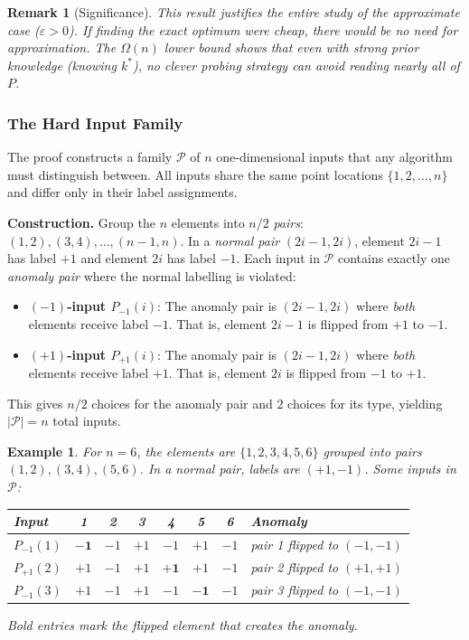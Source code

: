 \documentclass[11pt, a4paper]{article}
\theoremstyle{boxed}
\newtheorem{innerexample}{Example}[section]
\newtheorem{innerremark}{Remark}[section]
\newenvironment{example}
  {\begin{mdframed}[style=thmstyle]\begin{innerexample}}
  {\end{innerexample}\end{mdframed}}
\newenvironment{remark}
  {\begin{mdframed}[style=notestyle]\begin{innerremark}}
  {\end{innerremark}\end{mdframed}}
\newcommand{\kstar}{k^{*}}
\begin{document}
\begin{remark}[Significance]
This result justifies the entire study of the approximate case ($\varepsilon > 0$). If finding the exact optimum were cheap, there would be no need for approximation. The $\Omega(n)$ lower bound shows that \emph{even with strong prior knowledge} (knowing $\kstar$), no clever probing strategy can avoid reading nearly all of $P$.
\end{remark}

\subsubsection{The Hard Input Family}

The proof constructs a family $\mathcal{P}$ of $n$ one-dimensional inputs that any algorithm must distinguish between. All inputs share the same point locations $\{1, 2, \ldots, n\}$ and differ only in their label assignments.

\medskip
\noindent\textbf{Construction.} Group the $n$ elements into $n/2$ \emph{pairs}: $(1,2), (3,4), \ldots, (n-1, n)$. In a \emph{normal pair} $(2i-1, 2i)$, element $2i-1$ has label $+1$ and element $2i$ has label $-1$. Each input in $\mathcal{P}$ contains exactly one \emph{anomaly pair} where the normal labelling is violated:

\begin{itemize}
  \item \textbf{$(-1)$-input $P_{-1}(i)$}: The anomaly pair is $(2i-1, 2i)$ where \emph{both} elements receive label $-1$. That is, element $2i-1$ is flipped from $+1$ to $-1$.
  \item \textbf{$(+1)$-input $P_{+1}(i)$}: The anomaly pair is $(2i-1, 2i)$ where \emph{both} elements receive label $+1$. That is, element $2i$ is flipped from $-1$ to $+1$.
\end{itemize}

This gives $n/2$ choices for the anomaly pair and $2$ choices for its type, yielding $|\mathcal{P}| = n$ total inputs.

\begin{example}
  For $n = 6$, the elements are $\{1,2,3,4,5,6\}$ grouped into pairs $(1,2), (3,4), (5,6)$. In a normal pair, labels are $(+1, -1)$. Some inputs in $\mathcal{P}$:
  \begin{center}
  \begin{tabular}{lccccccl}
    \toprule
    Input & 1 & 2 & 3 & 4 & 5 & 6 & Anomaly \\
    \midrule
    $P_{-1}(1)$ & $\mathbf{-1}$ & $-1$ & $+1$ & $-1$ & $+1$ & $-1$ & pair 1 flipped to $(-1,-1)$ \\
    $P_{+1}(2)$ & $+1$ & $-1$ & $+1$ & $\mathbf{+1}$ & $+1$ & $-1$ & pair 2 flipped to $(+1,+1)$ \\
    $P_{-1}(3)$ & $+1$ & $-1$ & $+1$ & $-1$ & $\mathbf{-1}$ & $-1$ & pair 3 flipped to $(-1,-1)$ \\
    \bottomrule
  \end{tabular}
  \end{center}
  Bold entries mark the flipped element that creates the anomaly.
\end{example}
\end{document}
